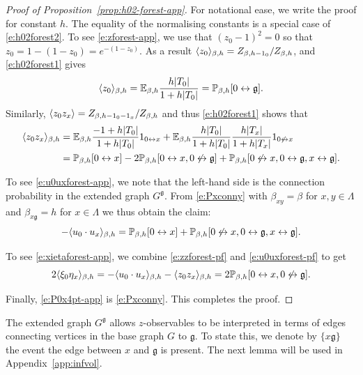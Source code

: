 \documentclass[11pt]{amsart}
\numberwithin{equation}{section}
\numberwithin{theorem}{section}
\newcommand{\ghost}{\mathfrak{g}}
\newcommand{\conn}{\leftrightarrow}
\newcommand{\nconn}{\not\leftrightarrow}
\newcommand{\1}{{\bf 1}}
\begin{document}
\begin{proof}[Proof of Proposition~\ref{prop:h02-forest-app}]
  For notational ease, we write the proof for constant $h$.
  The equality of the normalising constants is a special case of \eqref{e:h02forest2}.
  To see \eqref{e:zforest-app},
  we use that $(z_{0}-1)^2=0$ so that $z_{0}=1-(1-z_{0})=e^{-(1-z_{0})}$. As a result
  $\langle z_{0} \rangle_{\beta,h} = Z_{\beta,h-1_{0}} / Z_{\beta,h}$, and \eqref{e:h02forest1} gives
  \begin{equation} \label{e:zforest-pf}
    \avg{z_{0}}_{\beta,h} = \E_{\beta,h} \frac{h|T_0|}{1+h|T_0|} = \P_{\beta,h}[0\conn\ghost].
  \end{equation}
  Similarly, $\langle z_0z_x \rangle = Z_{\beta,h-1_0-1_x}/Z_{\beta,h}$ and thus \eqref{e:h02forest1} shows that
  \begin{align} \label{e:zzforest-pf}
    \avg{z_0z_x}_{\beta,h}
    &=\E_{\beta,h} \frac{-1+h|T_{0}|}{1+h|T_{0}|}1_{0\conn x} + \E_{\beta,h} \frac{h|T_{0}|}{1+h|T_{0}|} \frac{h|T_{x}|}{1+h|T_{x}|}1_{0\not\conn x}
      \nnb
  &= \P_{\beta,h}[0\conn x] -2\P_{\beta,h}[0\conn x,
    0\not\conn \ghost] + \P_{\beta,h}[0\not\conn x,
    0\conn \ghost,     x\conn \ghost].
\end{align}

To see \eqref{e:u0uxforest-app}, we note that the left-hand side is
the connection probability in the extended
graph $G^{\ghost}$.  From
\eqref{e:Pxconny} with $\beta_{xy} = \beta$ for $x,y\in\Lambda$ and
$\beta_{x\ghost} = h$ for $x\in\Lambda$ we thus obtain the claim:
  \begin{equation} \label{e:u0uxforest-pf}
    -\avg{u_0\cdot u_x}_{\beta,h}  =
    \P_{\beta,h}[0\conn x]+\P_{\beta,h}[0\nconn x, 0\conn \ghost, x\conn\ghost]
    .
  \end{equation}

  To see \eqref{e:xietaforest-app}, we combine \eqref{e:zzforest-pf} and \eqref{e:u0uxforest-pf} to get
  \begin{equation}
    2\avg{\xi_0\eta_x}_{\beta,h} = -\avg{u_{0}\cdot u_{x}}_{\beta,h} - \avg{z_{0}z_{x}}_{\beta,h} = 2\P_{\beta,h}[0\conn x,  0\not\conn \ghost].
  \end{equation}

  Finally, \eqref{e:P0x4pt-app} is \eqref{e:Pxconny}.
  This completes the proof.
\end{proof}

The extended 
graph $G^{\ghost}$ allows $z$-observables
to be interpreted in terms of edges connecting vertices in the base
graph $G$ to $\ghost$. To state this, we denote by $\{x\ghost\}$ the event
the edge between $x$ and $\ghost$ is present.
The next lemma will be used in Appendix~\ref{app:infvol}.
\end{document}

